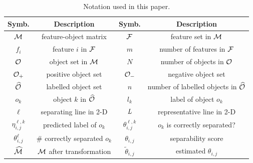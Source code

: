 \begin{table}[t!]
\centering
\small
\begin{tabular}{|c|c|c|c|}
 \hline
 Symb. & Description & Symb. & Description\\
 \hline
 \hline
 ${\mathcal{M}}$ & feature-object matrix & ${\mathcal{F}}$ & feature set in ${\mathcal{M}}$ \\
 \hline
 $f_i$ & feature $i$ in ${\mathcal{F}}$ & $m$ & number of features in ${\mathcal{F}}$\\
 \hline
 ${\mathcal{O}}$ & object set in ${\mathcal{M}}$ & $N$ & number of objects in ${\mathcal{O}}$\\
 \hline
 ${\mathcal{O}}_+$ & positive object set & ${\mathcal{O}}_-$ & negative object set\\
 \hline
 $\widehat{{\mathcal{O}}}$ & labelled object set & $n$ & number of labelled objects in $\widehat{{\mathcal{O}}}$\\
 \hline
 $o_k$ & object $k$ in $\widehat{{\mathcal{O}}}$ & $l_k$ & label of object $o_k$\\
 \hline
 $\ell$ & separating line in 2-D & $\mathit{L}$ & representative line in 2-D\\
 \hline
 $\eta_{i,j}^{\ell,k}$ & predicted label of $o_k$ & $\theta_{i,j}^{\ell,k}$ & $o_k$ is correctly separated? \\
 \hline
 $\theta_{i,j}^{\ell}$ & \# correctly separated $o_k$ & $\theta_{i,j}$ & separability score\\
 \hline
 $\widehat{{\mathcal{M}}}$ & ${\mathcal{M}}$ after transformation & $\tilde{\theta}_{i,j}$ & estimated $\theta_{i,j}$\\
 \hline
 \end{tabular}
\caption{Notation used in this paper.}
\label{tbl:notation}
\vspace{-18pt}
\end{table}


